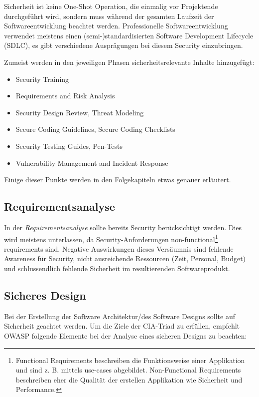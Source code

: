 Sicherheit ist keine One-Shot Operation, die einmalig vor Projektende durchgeführt wird, sondern muss während der gesamten Laufzeit der Softwareentwicklung beachtet werden. Professionelle Softwareentwicklung verwendet meistens einen (semi-)standardisierten Software Development Lifecycle (SDLC), es gibt verschiedene Ausprägungen bei diesem Security einzubringen.

Zumeist werden in den jeweiligen Phasen sicherheitsrelevante Inhalte hinzugefügt:

\begin{itemize}
	\item Security Training
	\item Requirements and Risk Analysis
	\item Security Design Review, Threat Modeling
	\item Secure Coding Guidelines, Secure Coding Checklists
	\item Security Testing Guides, Pen-Tests
	\item Vulnerability Management and Incident Response
\end{itemize}

Einige dieser Punkte werden in den Folgekapiteln etwas genauer erläutert.

\subsection{Requirementsanalyse}

In der \textit{Requirementsanalyse} sollte bereits Security berücksichtigt werden. Dies wird meistens unterlassen, da Security-Anforderungen non-functional\footnote{Functional Requirements beschreiben die Funktionsweise einer Applikation und sind z. B. mittels use-cases abgebildet. Non-Functional Requirements beschreiben eher die Qualität der erstellen Applikation wie Sicherheit und Performance.} requirements sind. Negative Auswirkungen dieses Versäumnis sind fehlende Awareness für Security, nicht ausreichende Ressourcen (Zeit, Personal, Budget) und schlussendlich fehlende Sicherheit im resultierenden Softwareprodukt.

\subsection{Sicheres Design}

Bei der Erstellung der Software Architektur/des Software Designs sollte auf Sicherheit geachtet werden. Um die Ziele der CIA-Triad zu erfüllen, empfehlt OWASP folgende Elemente bei der Analyse eines sicheren Designs zu beachten:

